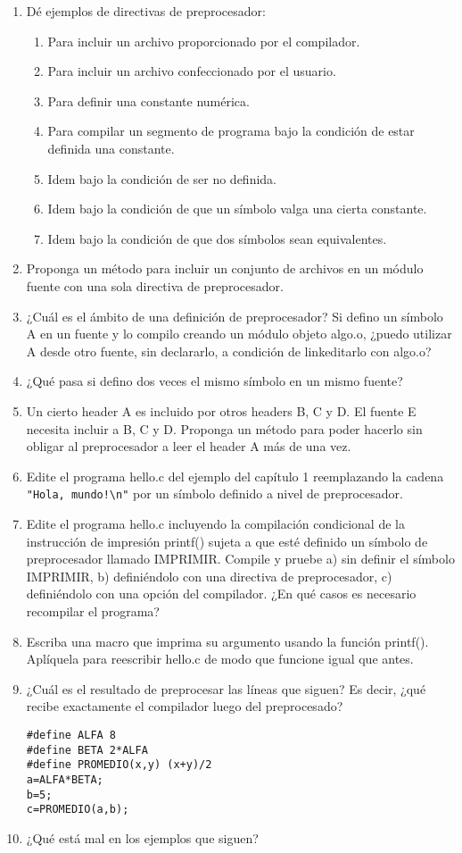 \begin{enumerate}
	\item Dé ejemplos de directivas de preprocesador:
		\begin{enumerate}[label=\alph*.]
\item Para incluir un archivo proporcionado por el compilador.
\item Para incluir un archivo confeccionado por el usuario.
\item Para definir una constante numérica.
\item Para compilar un segmento de programa bajo la condición de estar definida una constante.
\item Idem bajo la condición de ser no definida.
\item Idem bajo la condición de que un símbolo valga una cierta constante.
\item Idem bajo la condición de que dos símbolos sean equivalentes.
\end{enumerate}
\item Proponga un método para incluir un conjunto de archivos en un módulo fuente con una sola
directiva de preprocesador.
 \item ¿Cuál es el ámbito de una definición de preprocesador? Si defino un símbolo A en un fuente y lo
compilo creando un módulo objeto algo.o, ¿puedo utilizar A desde otro fuente, sin declararlo, a
condición de linkeditarlo con algo.o?
\item ¿Qué pasa si defino dos veces el mismo símbolo en un mismo fuente?
\item Un cierto header A es incluido por otros headers B, C y D. El fuente E necesita incluir a B, C y D.
Proponga un método para poder hacerlo sin obligar al preprocesador a leer el header A más de una
vez.
\item Edite el programa hello.c del ejemplo del capítulo 1 reemplazando la cadena \lstinline{"Hola, mundo!\n"} por
un símbolo definido a nivel de preprocesador.
\item  Edite el programa hello.c incluyendo la compilación condicional de la instrucción de impresión
printf() sujeta a que esté definido un símbolo de preprocesador llamado IMPRIMIR. Compile y pruebe
a) sin definir el símbolo IMPRIMIR, b) definiéndolo con una directiva de preprocesador, c)
definiéndolo con una opción del compilador. ¿En qué casos es necesario recompilar el programa?
\item  Escriba una macro que imprima su argumento usando la función printf(). Aplíquela para reescribir
hello.c de modo que funcione igual que antes.
\item  ¿Cuál es el resultado de preprocesar las líneas que siguen? Es decir, ¿qué recibe exactamente el
compilador luego del preprocesado?
\begin{lstlisting}
#define ALFA 8
#define BETA 2*ALFA
#define PROMEDIO(x,y) (x+y)/2
a=ALFA*BETA;
b=5;
c=PROMEDIO(a,b);
\end{lstlisting}
\item  ¿Qué está mal en los ejemplos que siguen?
	\begin{enumerate}[label=\alph*.]


\end{enumerate}
\end{enumerate}
